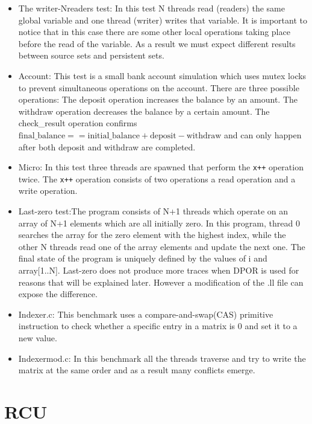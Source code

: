 \begin{itemize}
\item The writer-Nreaders test: In this test N threads read (readers) the same global variable and one thread (writer) writes that variable. It is important 
to notice that in this case there are some other local operations taking place before the read of the variable. As a result we must expect different results between 
source sets and persistent sets.

\item Account: This test is a small bank account simulation which uses mutex locks to prevent simultaneous operations on the account.
There are three possible operations: The deposit operation increases the balance by an amount. The withdraw operation decreases the balance by a certain amount. The check\_result operation confirms 
$\text{final\_balance} == \text{initial\_balance} + \text{deposit} - \text{withdraw}$ and can only happen after both deposit and withdraw are completed.

\item Micro: In this test three threads are spawned that perform the \verb|x++| operation twice. The \verb|x++| operation
consists of two operations a read operation and a write operation.

\item Last-zero test:The program consists of N+1 threads which operate on an array of
N+1 elements which are all initially zero. In this program, thread 0
searches the array for the zero element with the highest index, while
the other N threads read one of the array elements and update the
next one. The final state of the program is uniquely defined by the
values of i and array[1..N]. Last-zero does not produce more traces when DPOR is used for reasons
that will be explained later. However a modification of the .ll file can expose the difference.

\item Indexer.c: This benchmark uses a compare-and-swap(CAS) primitive instruction to check
whether a specific entry in a matrix is 0 and set it to a new
value. 

\item Indexermod.c: In this benchmark all the threads traverse and try to write the matrix at the same
order and as a result many conflicts emerge.


\end{itemize}

\section{RCU}

